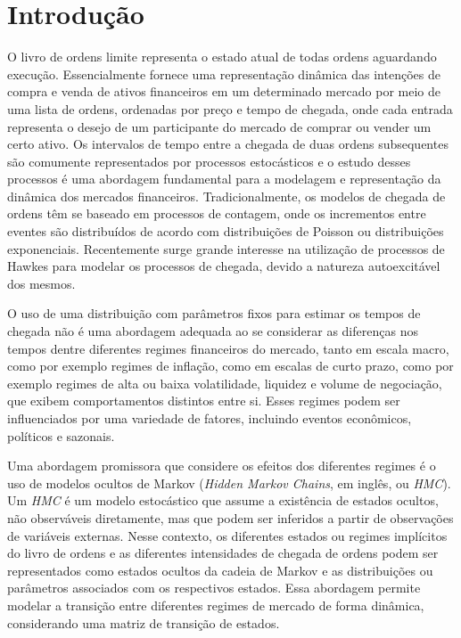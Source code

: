 \chapter{Introdução}

O livro de ordens limite representa o estado atual de todas ordens aguardando execução. Essencialmente fornece uma representação dinâmica das intenções de compra e venda de ativos financeiros em um determinado mercado por meio de uma lista de ordens, ordenadas por preço e tempo de chegada, onde cada entrada representa o desejo de um participante do mercado de comprar ou vender um certo ativo. Os intervalos de tempo entre a chegada de duas ordens subsequentes são comumente representados por processos estocásticos e o estudo desses processos é uma abordagem fundamental para a modelagem e representação da dinâmica dos mercados financeiros. Tradicionalmente, os modelos de chegada de ordens têm se baseado em processos de contagem, onde os incrementos entre eventes são distribuídos de acordo com distribuições de Poisson ou distribuições exponenciais. Recentemente surge grande interesse na utilização de processos de Hawkes para modelar os processos de chegada, devido a natureza autoexcitável dos mesmos.

O uso de uma distribuição com parâmetros fixos para estimar os tempos de chegada não é uma abordagem adequada ao se considerar as diferenças nos tempos dentre diferentes regimes financeiros do mercado, tanto em escala macro, como por exemplo regimes de inflação, como em escalas de curto prazo, como por exemplo regimes de alta ou baixa volatilidade, liquidez e volume de negociação, que exibem comportamentos distintos entre si. Esses regimes podem ser influenciados por uma variedade de fatores, incluindo eventos econômicos, políticos e sazonais.

Uma abordagem promissora que considere os efeitos dos diferentes regimes é o uso de modelos ocultos de Markov (\textit{Hidden Markov Chains}, em inglês, ou \textit{HMC}). Um \textit{HMC} é um modelo estocástico que assume a existência de estados ocultos, não observáveis diretamente, mas que podem ser inferidos a partir de observações de variáveis externas. Nesse contexto, os diferentes estados ou regimes implícitos do livro de ordens e as diferentes intensidades de chegada de ordens podem ser representados como estados ocultos da cadeia de Markov e as distribuições ou parâmetros associados com os respectivos estados. Essa abordagem permite modelar a transição entre diferentes regimes de mercado de forma dinâmica, considerando uma matriz de transição de estados.

